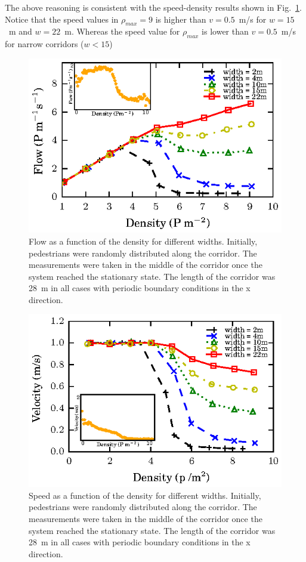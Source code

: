 The above reasoning is consistent with the speed-density results shown in Fig.~\ref{fundamental_diagram_flow}. Notice that the speed values in $\rho_{max} = 9$ is higher than $v=0.5$~m/s for $w=15$~m and $w=22$~m. Whereas the speed value for $\rho_{max}$ is lower than $v=0.5$~m/s for narrow corridors ($w<15$)\\

\begin{figure}[htbp!]
\includegraphics[width=\columnwidth]
{plots/flow-density_vd1_multiple_widths.eps}
\caption{\label{fundamental_diagram_flow} Flow as a function of the density for different widths. Initially, 
pedestrians were randomly distributed along the corridor. The measurements were taken in the middle
of the corridor once the system reached the stationary state. The length of the corridor 
was 28~m in all cases with periodic boundary conditions in the x direction.}
\end{figure}


\begin{figure}[htbp!]
\includegraphics[width=\columnwidth]
{plots/speed-density_vd1_multiple_widths.eps}
\caption{\label{fundamental_diagram_speed} Speed as a function of the density for different widths. Initially, 
pedestrians were randomly distributed along the corridor. The measurements were taken in the middle
of the corridor once the system reached the stationary state. The length of the corridor 
was 28~m in all cases with periodic boundary conditions in the x direction.}
\end{figure}

